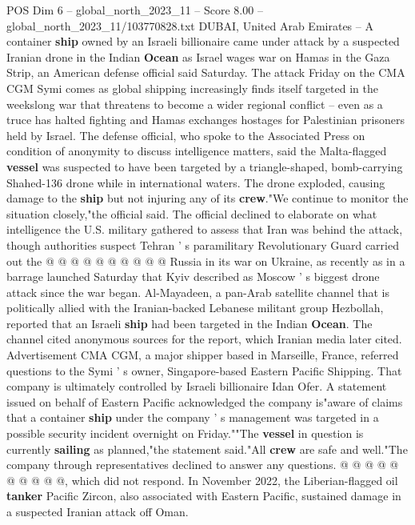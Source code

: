 \begin{textsample}{POS Dim 6 – global\_north\_2023\_11 – Score 8.00 – global\_north\_2023\_11/103770828.txt}  \label{ex:f6_pos_251}
DUBAI, United Arab Emirates -- A container \textbf{ship} owned by an Israeli billionaire came under attack by a suspected Iranian drone in the Indian \textbf{Ocean} as Israel wages war on Hamas in the Gaza Strip, an American defense official said Saturday.
The attack Friday on the CMA CGM Symi comes as global shipping increasingly finds itself targeted in the weekslong war that threatens to become a wider regional conflict -- even as a truce has halted fighting and Hamas exchanges hostages for Palestinian prisoners held by Israel.
The defense official, who spoke to the Associated Press on condition of anonymity to discuss intelligence matters, said the Malta-flagged \textbf{vessel} was suspected to have been targeted by a triangle-shaped, bomb-carrying Shahed-136 drone while in international waters.
The drone exploded, causing damage to the \textbf{ship} but not injuring any of its \textbf{crew}."We continue to monitor the situation closely,"the official said.
The official declined to elaborate on what intelligence the U.S. military gathered to assess that Iran was behind the attack, though authorities suspect Tehran ' s paramilitary Revolutionary Guard carried out the @ @ @ @ @ @ @ @ @ @ Russia in its war on Ukraine, as recently as in a barrage launched Saturday that Kyiv described as Moscow ' s biggest drone attack since the war began.
Al-Mayadeen, a pan-Arab satellite channel that is politically allied with the Iranian-backed Lebanese militant group Hezbollah, reported that an Israeli \textbf{ship} had been targeted in the Indian \textbf{Ocean}.
The channel cited anonymous sources for the report, which Iranian media later cited.
Advertisement CMA CGM, a major shipper based in Marseille, France, referred questions to the Symi ' s owner, Singapore-based Eastern Pacific Shipping.
That company is ultimately controlled by Israeli billionaire Idan Ofer.
A statement issued on behalf of Eastern Pacific acknowledged the company is"aware of claims that a container \textbf{ship} under the company ' s management was targeted in a possible security incident overnight on Friday.""The \textbf{vessel} in question is currently \textbf{sailing} as planned,"the statement said."All \textbf{crew} are safe and well."The company through representatives declined to answer any questions. @ @ @ @ @ @ @ @ @ @, which did not respond.
In November 2022, the Liberian-flagged oil \textbf{tanker} Pacific Zircon, also associated with Eastern Pacific, sustained damage in a suspected Iranian attack off Oman.

\end{textsample}
